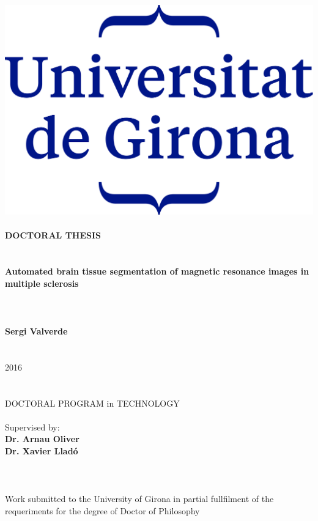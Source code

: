 \hspace{-1.25cm}
\parbox[c]{15cm}{  
  \centering
    \includegraphics[scale = 1]{./figures/logo-udg.png}
    \quad \\
    \quad \\
    \large \textbf{DOCTORAL THESIS}\\
    \quad \\ ~\\
    {
      \LARGE \textbf{Automated brain tissue segmentation of magnetic resonance images in multiple sclerosis}
    }\\~\\
    \quad \\
    \quad \\
    \textbf{Sergi Valverde}\\
    \quad \\
    \quad \\
    2016\\
    \quad \\
    \quad \\
    DOCTORAL PROGRAM in TECHNOLOGY\\
    \quad \\
    Supervised by:\\
    \textbf{ Dr. Arnau Oliver}\\
    \textbf{ Dr. Xavier Llad\'{o}}\\
    \quad \\
    \quad \\~\\
    Work submitted to the University of Girona in partial fullfilment of the requeriments for the degree of Doctor of Philosophy
    \quad \\
    \quad \\
  
}




